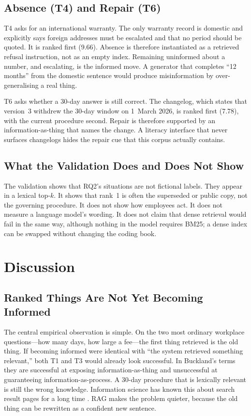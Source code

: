 \documentclass{isi2027}
\begin{document}
\subsection{Absence (T4) and Repair (T6)}

T4 asks for an international warranty. The only warranty record is domestic and explicitly says foreign addresses must be escalated and that no period should be quoted. It is ranked first (9.66). Absence is therefore instantiated as a retrieved refusal instruction, not as an empty index. Remaining uninformed about a number, and escalating, is the informed move. A generator that completes ``12 months'' from the domestic sentence would produce misinformation by over-generalising a real thing.

T6 asks whether a 30-day answer is still correct. The changelog, which states that version~3 withdrew the 30-day window on 1~March 2026, is ranked first (7.78), with the current procedure second. Repair is therefore supported by an information-as-thing that names the change. A literacy interface that never surfaces changelogs hides the repair cue that this corpus actually contains.

\subsection{What the Validation Does and Does Not Show}

The validation shows that RQ2's situations are not fictional labels. They appear in a lexical top-$k$. It shows that rank~1 is often the superseded or public copy, not the governing procedure. It does not show how employees act. It does not measure a language model's wording. It does not claim that dense retrieval would fail in the same way, although nothing in the model requires BM25; a dense index can be swapped without changing the coding book.

\section{Discussion}

\subsection{Ranked Things Are Not Yet Becoming Informed}

The central empirical observation is simple. On the two most ordinary workplace questions---how many days, how large a fee---the first thing retrieved is the old thing. If becoming informed were identical with ``the system retrieved something relevant,'' both T1 and T3 would already look successful. In Buckland's terms they are successful at exposing information-as-thing and unsuccessful at guaranteeing information-as-process. A 30-day procedure that is lexically relevant is still the wrong knowledge. Information science has known this about search result pages for a long time \citep{Lewandowski2023}. RAG makes the problem quieter, because the old thing can be rewritten as a confident new sentence.
\end{document}
